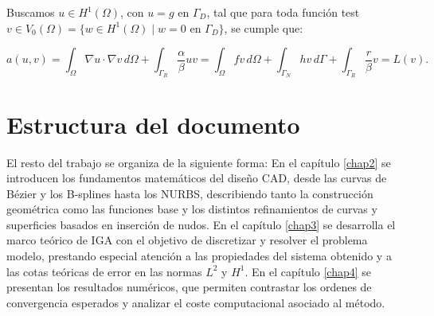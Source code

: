 \documentclass[11pt]{book}
\theoremstyle{plain} %
\theoremstyle{definition} %
\theoremstyle{definition} %
\begin{document}
Buscamos $u \in  H^1(\Omega)$, con  $u=g \text{ en } \Gamma_D$, tal que 
para toda función test $v \in V_0(\Omega)=\{w \in H^1(\Omega) \mid w=0 \text{ en } \Gamma_D\}$, se cumple que:

\vspace{-0.15cm}

\begin{equation}
    \label{eq:form_weak}
    a(u,v)=\int_{\Omega}\nabla u \cdot \nabla v\, d\Omega + \int_{\Gamma_R}\frac{\alpha}{\beta}uv=\int_{\Omega}fv \, d\Omega+\int_{\Gamma_N}hv\, d\Gamma+\int_{\Gamma_R}\frac{r}{\beta}v =L(v).
\end{equation}

\vspace{-0.15cm}




\vspace{-0.25cm}

\section{Estructura del documento}

\vspace{-0.1cm}

El resto del trabajo se organiza de la siguiente forma: En el capítulo \ref{chap2}
se introducen los fundamentos matemáticos del diseño CAD, desde las curvas
de Bézier y los B-splines hasta los NURBS, describiendo tanto la construcción
geométrica como las funciones base y los distintos refinamientos de curvas y superficies basados en inserción de nudos.
En el capítulo \ref{chap3} se desarrolla el marco teórico de IGA con el objetivo de
discretizar y resolver el problema modelo, prestando especial atención a las propiedades
del sistema obtenido y a las cotas teóricas de error en las normas $L^2$ y $H^1$.
En el capítulo \ref{chap4} se presentan los resultados numéricos, que permiten contrastar los ordenes de convergencia esperados
y analizar el coste computacional asociado al método.
\end{document}
